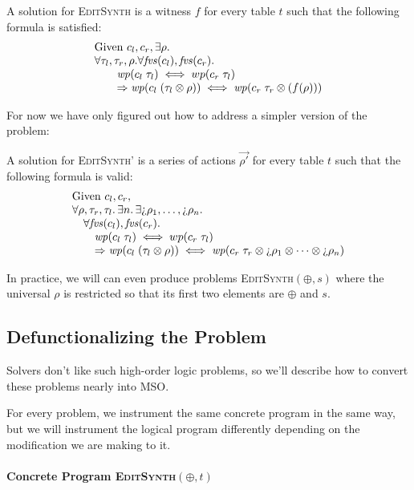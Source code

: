 A solution for \textsc{EditSynth} is a witness $f$ for every table $t$ such that
the following formula is satisfied:
\[\begin{array}{l}
    \text{Given } c_l,c_r, \exists \rho. \\
    \forall \tau_l,\tau_r,\rho. \forall \mathit{fvs}(c_l), \mathit{fvs}(c_r). \\
    \qquad \mathit{wp}(c_l\; \tau_l) \iff wp(c_r\; \tau_l) \\
    \qquad \Rightarrow \mathit{wp}(c_l\; (\tau_l \otimes \rho)) \iff \mathit{wp}(c_r\; \tau_r \otimes (f(\rho)))
  \end{array}\]

For now we have only figured out how to address a simpler version of the
problem:

A solution for \textsc{EditSynth'} is a series of actions $\vec{\rho'}$ for every table $t$ such that
the following formula is valid:
\[\begin{array}{l}
    \text{Given } c_l,c_r, \\
    \forall \rho, \tau_r, \tau_l.\, \exists n.\, \exists \hole\rho_1,\ldots,\hole\rho_n. \\ 
    \quad \forall \fvs(c_l), \fvs(c_r). \\
    \qquad \wp(c_l\; \tau_l) \iff wp(c_r\; \tau_l) \\
    \qquad \Rightarrow \wp(c_l\; (\tau_l \otimes \rho)) \iff \wp(c_r\; \tau_r
    \otimes \hole\rho_1 \otimes \cdots \otimes \hole\rho_n )
  \end{array}\]

In practice, we will can even produce problems \textsc{EditSynth}$(\oplus,s)$
where the universal $\rho$ is restricted so that its first two elements are
$\oplus$ and $s$.



\subsection{Defunctionalizing the Problem}

Solvers don't like such high-order logic problems, so we'll describe how to
convert these problems nearly into MSO.

For every problem, we instrument the same concrete program in the same way, but
we will instrument the logical program differently depending on the modification
we are making to it.

\paragraph{Concrete Program \textsc{EditSynth}$(\oplus, t)$}

